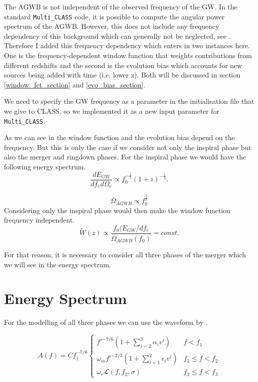 The AGWB is not independent of the observed frequency of the GW. In the standard 
{\tt Multi\_CLASS} code, it is possible to compute the angular power spectrum of the AGWB. However, this does not include any frequency dependency of this background which can generally not be neglected, see \cite{dallarmi_dipole_2022}. Therefore I added this frequency dependency which enters in two instances here. One is the frequency-dependent window function that weights contributions from different redshifts and the second is the evolution bias which accounts for new sources being added with time (i.e. lower z). Both will be discussed in section \ref{window_fct_section} and \ref{evo_bias_section}.

We need to specify the GW frequency as a parameter in the initialisation file that we give to CLASS, so we implemented it as a new input parameter for {\tt Multi\_CLASS}.

As we can see in \cite{dallarmi_dipole_2022} the window function and the evolution bias 
depend on the frequency. But this is only the case if we consider not only the
inspiral phase but also the merger and ringdown phases. For the inspiral phase we would have the following energy spectrum.
\begin{equation}
    \frac{dE_{GW}}{df_e d\Omega_e} \propto f_0^{-\frac{1}{3}}(1+z)^{-\frac{1}{3}} .
\end{equation}

\begin{equation}
    \bar{\Omega}_{AGWB}\propto f_0^{\frac{2}{3}}
\end{equation}
Considering only the inspiral phase would then make the window function frequency independent.
\begin{equation}
    \tilde{W}(z)\propto \frac{f_0(E_{GW}/df_e}{\bar{\Omega}_{AGWB}(f_0)} = const.
\end{equation}

For that reason, it is necessary to consider all three phases of the merger which we will see in the energy spectrum.


\section{Energy Spectrum}

For the modelling of all three phases we can 
use the waveform by \cite{ajith_inspiral-merger-ringdown_2011}.

\[ A(f) = C f_1^{-7/6} \begin{cases}
        f'^{-7/6}(1+ \sum_{i=2}^3\alpha_i v^i) & f<f_1 \\
        \omega_m f'^{-2/3}(1+ \sum_{i=1}^2 \epsilon_i v^i) & f_1 \leq f < f_2 \\
        \omega_r \mathcal{L}(f, f_2, \sigma) & f_2 \leq f < f_3
\end{cases}
\]

